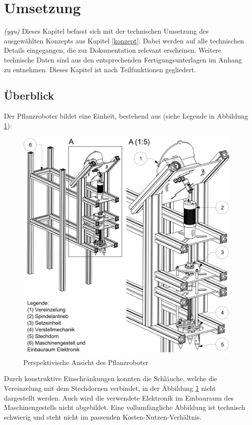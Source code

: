 \newpage
\section{Umsetzung} 
\label{kap:Umsetzung}
\textit{(ygu)} Dieses Kapitel befasst sich mit der technischen Umsetzung des ausgewählten Konzepts aus Kapitel \ref{konzept}. Dabei werden auf alle technischen Details eingegangen, die zur Dokumentation relevant erscheinen. Weitere technische Daten sind aus den entsprechenden Fertigungsunterlagen im Anhang zu entnehmen. Dieses Kapitel ist nach Teilfunktionen gegliedert. 
\subsection{Überblick}
Der Pflanzroboter bildet eine Einheit, bestehend aus (siehe Legende in Abbildung \ref{fig:uberblick}):
	\begin{figure}[H]
	\includegraphics[scale=0.8]{Illustrationen/6-Umsetzung/uberblick.jpg}
	\caption{Perspektivische Ansicht des Pflanzroboter}
	\label{fig:uberblick}
	\end{figure}
Durch konstruktive Einschränkungen konnten die Schläuche, welche die Vereinzelung mit dem Stechdornen verbindet, in der Abbildung \ref{fig:uberblick} nicht dargestellt werden. Auch wird die verwendete Elektronik im Einbauraum des Maschinengestells nicht  abgebildet. Eine vollumfängliche Abbildung ist technisch schwierig und steht nicht im passenden Kosten-Nutzen-Verhältnis.
